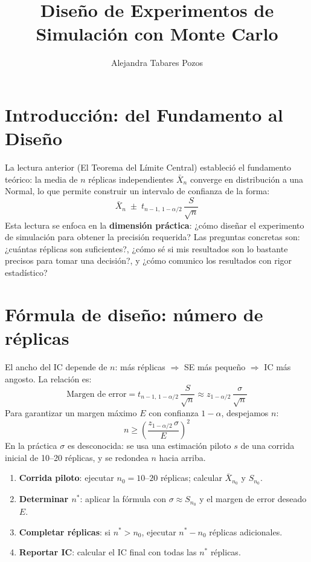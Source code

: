 \documentclass[11pt, letterpaper]{article}
\title{Diseño de Experimentos de Simulación con Monte Carlo}
\author{Alejandra Tabares Pozos}
\date{}
\begin{document}
\maketitle
\tableofcontents
\newpage

\section{Introducción: del Fundamento al Diseño}

La lectura anterior (El Teorema del Límite Central) estableció el fundamento teórico: la media de $n$ réplicas independientes $\bar{X}_n$ converge en distribución a una Normal, lo que permite construir un intervalo de confianza de la forma:
\begin{equation}
\bar{X}_n \;\pm\; t_{n-1,\,1-\alpha/2}\,\frac{S}{\sqrt{n}}
\end{equation}
Esta lectura se enfoca en la \textbf{dimensión práctica}: ¿cómo diseñar el experimento de simulación para obtener la precisión requerida? Las preguntas concretas son: ¿cuántas réplicas son suficientes?, ¿cómo sé si mis resultados son lo bastante precisos para tomar una decisión?, y ¿cómo comunico los resultados con rigor estadístico?

\section{Fórmula de diseño: número de réplicas}

El ancho del IC depende de $n$: más réplicas $\Rightarrow$ SE más pequeño $\Rightarrow$ IC más angosto. La relación es:
\[
\text{Margen de error} = t_{n-1,\,1-\alpha/2}\,\frac{S}{\sqrt{n}} \approx z_{1-\alpha/2}\,\frac{\sigma}{\sqrt{n}}
\]
Para garantizar un margen máximo $E$ con confianza $1-\alpha$, despejamos $n$:
\begin{equation}
n \ge \left(\frac{z_{1-\alpha/2}\,\sigma}{E}\right)^2
\end{equation}
En la práctica $\sigma$ es desconocida: se usa una estimación piloto $s$ de una corrida inicial de 10--20 réplicas, y se redondea $n$ hacia arriba.

\begin{metodobox}
\begin{enumerate}
    \item \textbf{Corrida piloto}: ejecutar $n_0 = 10\text{--}20$ réplicas; calcular $\bar{X}_{n_0}$ y $S_{n_0}$.
    \item \textbf{Determinar $n^*$}: aplicar la fórmula con $\sigma \approx S_{n_0}$ y el margen de error deseado $E$.
    \item \textbf{Completar réplicas}: si $n^* > n_0$, ejecutar $n^* - n_0$ réplicas adicionales.
    \item \textbf{Reportar IC}: calcular el IC final con todas las $n^*$ réplicas.
\end{enumerate}
\end{metodobox}
\end{document}
